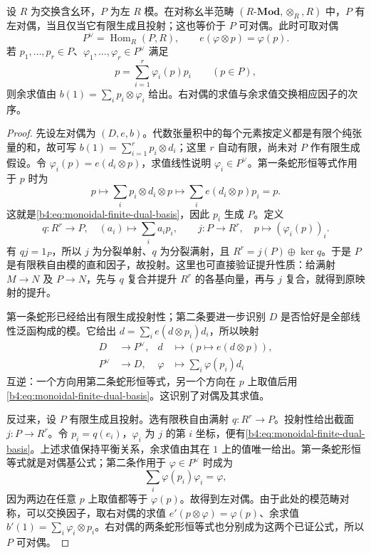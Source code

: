 \begin{theorem}[可对偶模的判据]\label{b4:thm:dualizable-projective-modules}
	设 \(R\) 为交换含幺环，\(P\) 为左 \(R\) 模。在对称幺半范畴 \((R\text{-}\mathbf{Mod},\otimes_R,R)\) 中，\(P\) 有左对偶，当且仅当它有限生成且投射；这也等价于 \(P\) 可对偶。此时可取对偶
	\[
		P^\vee=\operatorname{Hom}_R(P,R), \qquad e(\varphi\otimes p)=\varphi(p).
	\]
	若 \(p_1,\ldots,p_r\in P\)、\(\varphi_1,\ldots,\varphi_r\in P^\vee\) 满足
	\begin{equation}\label{b4:eq:monoidal-finite-dual-basis}
		p=\sum_{i=1}^r\varphi_i(p)p_i\qquad(p\in P),
	\end{equation}
	则余求值由 \(b(1)=\sum_i p_i\otimes\varphi_i\) 给出。右对偶的求值与余求值交换相应因子的次序。
\end{theorem}
\begin{proof}
	先设左对偶为 \((D,e,b)\)。代数张量积中的每个元素按定义都是有限个纯张量的和，故可写 \(b(1)=\sum_{i=1}^r p_i\otimes d_i\)；这里 \(r\) 自动有限，尚未对 \(P\) 作有限生成假设。令 \(\varphi_i(p)=e(d_i\otimes p)\)，求值线性说明 \(\varphi_i\in P^\vee\)。第一条蛇形恒等式作用于 \(p\) 时为
	\[
		p\longmapsto\sum_i p_i\otimes d_i\otimes p \longmapsto\sum_i e(d_i\otimes p)p_i=p.
	\]
	这就是\eqref{b4:eq:monoidal-finite-dual-basis}，因此 \(p_i\) 生成 \(P\)。定义
	\[
		q:R^r\longrightarrow P,\quad(a_i)\longmapsto\sum_i a_ip_i, \qquad j:P\longrightarrow R^r,\quad p\longmapsto(\varphi_i(p))_i.
	\]
	有 \(qj=1_P\)，所以 \(j\) 为分裂单射、\(q\) 为分裂满射，且 \(R^r=j(P)\oplus\ker q\)。于是 \(P\) 是有限秩自由模的直和因子，故投射。这里也可直接验证提升性质：给满射 \(M\to N\) 及 \(P\to N\)，先与 \(q\) 复合并提升 \(R^r\) 的各基向量，再与 \(j\) 复合，就得到原映射的提升。

	第一条蛇形已经给出有限生成投射性；第二条要进一步识别 \(D\) 是否恰好是全部线性泛函构成的模。它给出 \(d=\sum_i e(d\otimes p_i)d_i\)，所以映射
	\[
		\begin{aligned}
			D&\longrightarrow P^\vee,&d&\longmapsto(p\longmapsto e(d\otimes p)),\\
			P^\vee&\longrightarrow D,&\varphi&\longmapsto\sum_i\varphi(p_i)d_i
		\end{aligned}
	\]
	互逆：一个方向用第二条蛇形恒等式，另一个方向在 \(p\) 上取值后用\eqref{b4:eq:monoidal-finite-dual-basis}。这识别了对偶及其求值。

	反过来，设 \(P\) 有限生成且投射。选有限秩自由满射 \(q:R^r\to P\)。投射性给出截面 \(j:P\to R^r\)。令 \(p_i=q(e_i)\)，\(\varphi_i\) 为 \(j\) 的第 \(i\) 坐标，便有\eqref{b4:eq:monoidal-finite-dual-basis}。上述求值保持平衡关系，余求值由其在 \(1\) 上的值唯一给出。第一条蛇形恒等式就是对偶基公式；第二条作用于 \(\varphi\in P^\vee\) 时成为
	\[
		\sum_i\varphi(p_i)\varphi_i=\varphi,
	\]
	因为两边在任意 \(p\) 上取值都等于 \(\varphi(p)\)。故得到左对偶。由于此处的模范畴对称，可以交换因子，取右对偶的求值 \(e'(p\otimes\varphi)=\varphi(p)\)、余求值 \(b'(1)=\sum_i\varphi_i\otimes p_i\)。右对偶的两条蛇形恒等式也分别成为这两个已证公式，所以 \(P\) 可对偶。
\end{proof}

